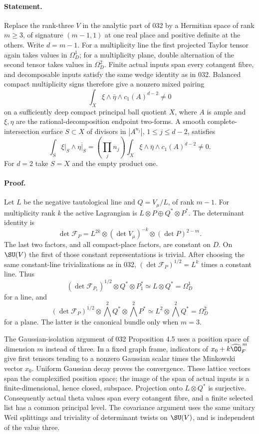 \documentclass[11pt]{article}
\theoremstyle{definition}\newtheorem{definition}[theorem]{Definition}\newtheorem{remark}[theorem]{Remark}
\begin{document}
\paragraph{Statement.}
Replace the rank-three $V$ in the analytic part of 032 by a Hermitian
space of rank $m\geq3$, of signature $(m-1,1)$ at one real place and
positive definite at the others. Write $d=m-1$. For a multiplicity line
the first projected Taylor tensor again takes values in $\Omega_D^1$;
for a multiplicity plane, double alternation of the second tensor takes
values in $\Omega_D^2$. Finite actual inputs span every cotangent
fibre, and decomposable inputs satisfy the same wedge identity as in
032. Balanced compact multiplicity signs therefore give a nonzero
mixed pairing
\begin{equation}\label{A4-pair}
 \int_X\xi\wedge\bar\eta\wedge c_1(A)^{d-2}\ne0
\end{equation}
on a sufficiently deep compact principal ball quotient $X$, where
$A$ is ample and $\xi,\eta$ are the rational-decomposition endpoint
two-forms. A smooth complete-intersection surface $S\subset X$ of
divisors in $|A^{n_j}|$, $1\leq j\leq d-2$, satisfies
\[
 \int_S\xi|_S\wedge\overline{\eta|_S}
 =\left(\prod_jn_j\right)
      \int_X\xi\wedge\bar\eta\wedge c_1(A)^{d-2}\ne0.
\]
For $d=2$ take $S=X$ and the empty product one.

\paragraph{Proof.}
Let $L$ be the negative tautological line and $Q=V_\mu/L$, of rank
$m-1$. For multiplicity rank $k$ the active Lagrangian is
$L\otimes P\oplus Q^*\otimes P^*$. The determinant identity is
\[
 \det\mathcal F_P
 =L^{2k}\otimes(\det V_\mu)^{-k}\otimes(\det P)^{2-m}.
\]
The last two factors, and all compact-place factors, are constant on
$D$. On $\SU(V)$ the first of those constant representations is
trivial. After choosing the same constant-line trivializations as in
032, $(\det\mathcal F_P)^{1/2}=L^k$ times a constant line. Thus
\[
 (\det\mathcal F_{P_1})^{1/2}\otimes Q^*\otimes P_1^*
       \simeq L\otimes Q^*=\Omega_D^1
\]
for a line, and
\[
 (\det\mathcal F_P)^{1/2}\otimes
             \bigwedge^2Q^*\otimes\bigwedge^2P^*
       \simeq L^2\otimes\bigwedge^2Q^*=\Omega_D^2
\]
for a plane. The latter is the canonical bundle only when $m=3$.

The Gaussian-isolation argument of 032 Proposition 4.5 uses a position
space of dimension $m$ instead of three. In a fixed graph frame,
indicators of $x_0+k\widehat{\OO}_F^{\,m}$ give first tensors tending
to a nonzero Gaussian scalar times the Minkowski vector $x_0$.
Uniform Gaussian decay proves the convergence. These lattice vectors
span the complexified position space; the image of the span of actual
inputs is a finite-dimensional, hence closed, subspace. Projection
onto $L\otimes Q^*$ is surjective. Consequently actual theta values
span every cotangent fibre, and a finite selected list has a common
principal level. The covariance argument uses the same unitary Weil
splittings and triviality of determinant twists on $\SU(V)$, and is
independent of the value three.
\end{document}
